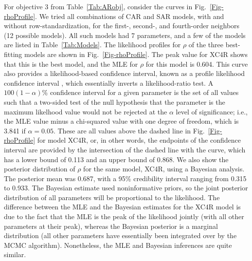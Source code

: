 \documentclass[11pt, titlepage]{article}\usepackage[]{graphicx}\usepackage[]{color}
\begin{document}
For objective 3 from Table~\ref{Tab:ARobj}, consider the curves in Fig.~\ref{Fig-rhoProfile}.  We tried all combinations of CAR and SAR models, with and without row-standardization, for the first-, second-, and fourth-order neighbors (12 possible models).  All such models had 7 parameters, and a few of the models are listed in Table~\ref{Tab:Models}. The likelihood profiles for $\rho$ of the three best-fitting models are shown in Fig.~\ref{Fig-rhoProfile}. The peak value for XC4R shows that this is the best model, and the MLE for $\rho$ for this model is 0.604.  This curve also provides a likelihood-based confidence interval, known as a profile likelihood confidence interval \citep{Box:Cox:anal:1964}, which essentially inverts a likelihood-ratio test. A $100(1 - \alpha)$\% confidence interval for a given parameter is the set of all values such that a two-sided test of the null hypothesis that the parameter is the maximum likelhood value would not be rejected at the $\alpha$ level of significance; i.e., the MLE value minus a chi-squared value with one degree of freedom, which is 3.841 if $\alpha = 0.05$.  These are all values above the dashed line in Fig.~\ref{Fig-rhoProfile} for model XC4R, or, in other words, the endpoints of the confidence interval are provided by the intersection of the dashed line with the curve, which has a lower bound of 0.113 and an upper bound of 0.868.  We also show the posterior distribution of $\rho$ for the same model, XC4R, using a Bayesian analysis.  The posterior mean was 0.687, with a 95\% credibility interval ranging from 0.315 to 0.933.  The Bayesian estimate used noninformative priors, so the joint posterior distribution of all parameters will be proportional to the likelihood.  The difference between the MLE and the Bayesian estimates for the XC4R model is due to the fact that the MLE is the peak of the likelihood jointly (with all other parameters at their peak), whereas the Bayesian posterior is a marginal distribution (all other parameters have essentially been integrated over by the MCMC algorithm).  Nonetheless, the MLE and Bayesian inferences are quite similar. 
\end{document}
